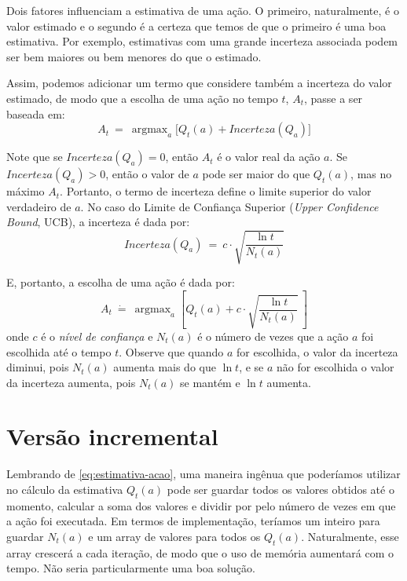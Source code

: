 \documentclass{article}
\DeclareMathOperator*{\argmax}{argmax}
\begin{document}
            Dois fatores influenciam a estimativa de uma ação. O primeiro, naturalmente, é o valor estimado e o segundo é a certeza que temos de que o primeiro é uma boa estimativa. Por exemplo, estimativas com uma grande incerteza associada podem ser bem maiores ou bem menores do que o estimado.
            
            Assim, podemos adicionar um termo que considere também a incerteza do valor estimado, de modo que a escolha de uma ação no tempo $t$, $A_t$, passe a ser baseada em:            
            \begin{equation}
                A_t \ = \ \argmax_a \Big[ Q_t(a) + Incerteza(Q_a) \Big]
            \end{equation}           
            
            Note que se $Incerteza(Q_a) = 0$, então $A_t$ é o valor real da ação $a$. Se $Incerteza(Q_a) > 0$, então o valor de $a$ pode ser maior do que $Q_t(a)$, mas no máximo $A_t$. Portanto, o termo de incerteza define o limite superior do valor verdadeiro de $a$. No caso do Limite de Confiança Superior (\emph{Upper Confidence Bound}, UCB), a incerteza é dada por:            
            \begin{equation}
                Incerteza(Q_a) \ = \ c \cdot \sqrt{\frac{\ln{t}}{N_t(a)}}
            \end{equation}
            
            E, portanto, a escolha de uma ação é dada por:            
            \begin{equation}
                A_t \ \dot{=} \ \argmax_a \left[ Q_t(a) + c \cdot \sqrt{\frac{\ln{t}}{N_t(a)}} \ \right]
            \end{equation}            
            \noindent
            onde $c$ é o \emph{nível de confiança} e $N_t(a)$ é o número de vezes que a ação $a$ foi escolhida até o tempo $t$. Observe que quando $a$ for escolhida, o valor da incerteza diminui, pois $N_t(a)$ aumenta mais do que $\ln{t}$, e se $a$ não for escolhida o valor da incerteza aumenta, pois $N_t(a)$ se mantém e $\ln{t}$ aumenta.
            
    \section{Versão incremental}

        Lembrando de \eqref{eq:estimativa-acao}, uma maneira ingênua que poderíamos utilizar no cálculo da estimativa $Q_t(a)$ pode ser guardar todos os valores obtidos até o momento, calcular a soma dos valores e dividir por pelo número de vezes em que a ação foi executada. Em termos de implementação, teríamos um inteiro para guardar $N_t(a)$ e um array de valores para todos os $Q_t(a)$. Naturalmente, esse array crescerá a cada iteração, de modo que o uso de memória aumentará com o tempo. Não seria particularmente uma boa solução.
        
\end{document}
